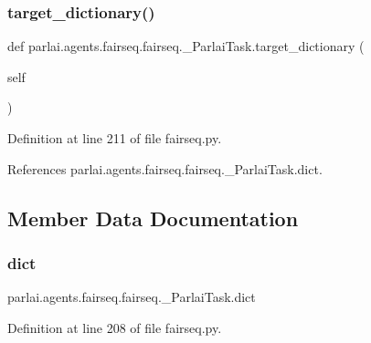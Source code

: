 \subsubsection{\texorpdfstring{target\+\_\+dictionary()}{target\_dictionary()}}
{\footnotesize\ttfamily def parlai.\+agents.\+fairseq.\+fairseq.\+\_\+\+Parlai\+Task.\+target\+\_\+dictionary (\begin{DoxyParamCaption}\item[{}]{self }\end{DoxyParamCaption})}



Definition at line 211 of file fairseq.\+py.



References parlai.\+agents.\+fairseq.\+fairseq.\+\_\+\+Parlai\+Task.\+dict.



\subsection{Member Data Documentation}
\mbox{\label{classparlai_1_1agents_1_1fairseq_1_1fairseq_1_1__ParlaiTask_ac8df07e62c32b898201ed923270c4ec4}} 
\subsubsection{\texorpdfstring{dict}{dict}}
{\footnotesize\ttfamily parlai.\+agents.\+fairseq.\+fairseq.\+\_\+\+Parlai\+Task.\+dict}



Definition at line 208 of file fairseq.\+py.



